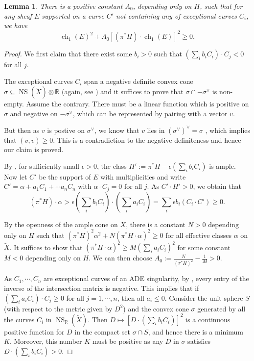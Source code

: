 \documentclass[12pt]{amsart}
\newtheorem{lemma}[theorem]{Lemma}
\theoremstyle{definition}
\DeclareMathOperator{\ch}{ch}
\DeclareMathOperator{\NS}{NS}
\begin{document}
\begin{lemma}\label{constIZ}
There is a positive constant $A_0$, depending only on $H$, such that for any sheaf $E$ supported on a curve $C'$ not containing any of exceptional curves $C_i$, we have $$\ch_1(E)^2 + A_0 [(\pi^\ast H)\cdot\ch_1(E)]^2 \geq 0.$$
\end{lemma}
\begin{proof}
We first claim that there exist some $b_i>0$ such that $(\displaystyle \sum_i b_iC_i) \cdot C_j <0$ for all $j$.

The exceptional curves $C_i$ span a negative definite convex cone $\sigma \subseteq \NS(\widetilde{X}) \otimes \mathbb{R}$ (again, see \cite[Theorem A.7]{Reid}) 
and it suffices to prove that $\sigma \cap -\sigma^\vee$ is non-empty.
Assume the contrary. 
There must be a linear function which is positive on $\sigma$ and negative on $-\sigma^\vee$, 
which can be represented by pairing with a vector $v$.

But then as $v$ is postive on $\sigma^\vee$, we know that $v$ lies in $(\sigma^\vee)^\vee = \sigma$ , which implies that $(v,v)\geq 0$.   
This is a contradiction to the negative definiteness and hence our claim is proved.

By \cite[Exercise 4.16]{Reid}, for sufficiently small $\epsilon>0$, the class $H':=\pi^\ast H - \epsilon(\displaystyle \sum_i b_iC_i)$ is ample.
Now let $C'$ be the support of $E$ with multiplicities and write $C'= \alpha + a_1C_1+ \cdots a_nC_n$ with $\alpha \cdot C_j=0$ for all $j$. 
As  $C' \cdot H'>0$, we obtain that $$(\pi^\ast H) \cdot \alpha > \epsilon (\displaystyle \sum_i b_iC_i) \cdot (\displaystyle \sum_i a_iC_i) = \sum_i \epsilon b_i (C_i \cdot C') \geq 0.$$


By the openness of the ample cone on $X$, there is a constant $N>0$ depending only on $H$ such that $(\pi^\ast H)^2 \alpha^2 + N(\pi^\ast H \cdot \alpha)^2 \geq 0$ 
for all effective classes $\alpha$ on $\widetilde{X}$.
It suffices to show that $(\pi^\ast H \cdot \alpha)^2 \geq M(\displaystyle \sum_i a_iC_i)^2$ for some constant $M<0$ depending only on $H$.
We can then choose $A_0:= \frac{N}{(\pi^\ast H)^2} - \frac{1}{M} >0$.

As $C_1,\cdots, C_n$ are exceptional curves of an ADE singularity, 
by \cite[Proposition 10.18(iii)]{Car05},
every entry of the inverse of the intersection matrix is negative.
This implies that if $(\displaystyle \sum_i a_iC_i)\cdot C_j \geq 0$ for all $j=1, \cdots, n$, then all $a_i \leq 0$.
Consider the unit sphere $S$ (with respect to the metric given by $D^2$)
and the convex cone $\sigma$ generated by all the curves $C_i$ in $\NS_{\mathbb{R}}(\widetilde{X})$.
Then $D \mapsto [D \cdot (\displaystyle \sum_i b_iC_i)]^2$ is a continuous positive function for $D$ in the compact set $\sigma \cap S$, and hence there is a minimum $K$.
Moreover, this number $K$ must be positive as any $D$ in $\sigma$ satisfies $D \cdot (\displaystyle \sum_i b_iC_i) > 0$.


\end{proof}
\end{document}
